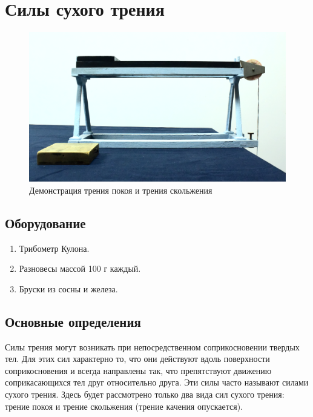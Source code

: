 \documentclass[All.tex]{subfiles}
\begin{document}

	

		\section{Силы сухого трения}

	
	\begin{figure}[H]
		\centering 	
		\includegraphics[width=0.9\linewidth]{friction-4.png}
		\caption{Демонстрация трения покоя и трения скольжения}
		\label{friction-4}
	\end{figure}
	
	\subsection*{\textcolor{PineGreen}{Оборудование}}
	
	\begin{enumerate} 
		\item Трибометр Кулона.
		\item Разновесы массой 100 г каждый.
		\item Бруски из сосны и железа.
		
	\end{enumerate}

	\subsection*{\textcolor{PineGreen}{Основные определения}}
	
Силы трения могут возникать при непосредственном соприкосновении твердых тел.
Для этих сил характерно то, что они действуют вдоль поверхности соприкосновения и всегда направлены 
	так, что препятствуют движению соприкасающихся тел друг относительно друга.
	Эти силы часто называют силами сухого трения. 
	Здесь будет рассмотрено только два вида сил сухого трения: трение покоя 
	и трение скольжения (трение качения опускается).
	
\end{document}
